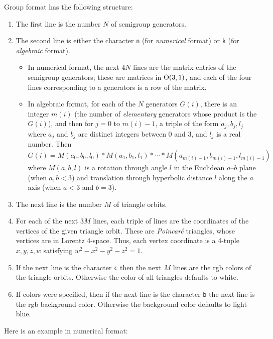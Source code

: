 \documentclass[12pt]{article}
\begin{document}
Group format has the following structure:
\begin{enumerate}
\item{The first line is the number $N$ of semigroup generators.}
\item{The second line is either the character {\tt n} 
(for {\em numerical} format) or {\tt k} (for {\em algebraic} format).
\begin{itemize}
\item{In numerical format, the next $4N$ lines are the matrix entries of
the semigroup generators; these are matrices in $\textnormal{O}(3,1)$, and
each of the four lines corresponding to a generators is a row of the matrix.}
\item{In algebraic format, for each of the $N$ generators $G(i)$, there is an
integer $m(i)$ (the number of {\em elementary} generators whose product is the
$G(i)$), and then for $j=0$ to $m(i)-1$, a triple of the form
$a_j,b_j,l_j$ where $a_j$ and $b_j$ are distinct integers between $0$ and $3$, and
$l_j$ is a real number. Then 
$$G(i)=M(a_0,b_0,l_0)*M(a_1,b_1,l_1)*\cdots *M(a_{m(i)-1},b_{m(i)-1},l_{m(i)-1})$$
where $M(a,b,l)$ is a rotation through angle $l$ in the Euclidean $a$--$b$ plane
(when $a,b < 3$) and translation through hyperbolic distance $l$ along the
$a$ axis (when $a<3$ and $b=3$).}
\end{itemize}
}
\item{The next line is the number $M$ of triangle orbits.}
\item{For each of the next $3M$ lines, each triple of lines are the
coordinates of the vertices of the given triangle orbit. These are {\em Poincar\'e}
triangles, whose vertices are in Lorentz 4-space. Thus, each vertex 
coordinate is a 4-tuple $x,y,z,w$ satisfying $w^2-x^2-y^2-z^2=1$.}
\item{If the next line is the character {\tt c} then the next $M$ lines are
the rgb colors of the triangle orbits. Otherwise the color of all triangles
defaults to white.}
\item{If colors were specified, then if the next line is the character {\tt b}
the next line is the rgb background color. Otherwise the background color defaults
to light blue.}
\end{enumerate}

Here is an example in numerical format:
\end{document}
